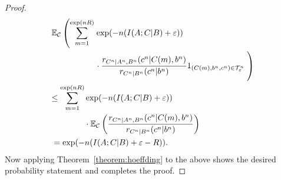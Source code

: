 \documentclass[journal]{IEEEtran}
\newcommand{\generalpmf}{r}
\newcommand{\generalrvOne}{A}
\newcommand{\generalrvTwo}{B}
\newcommand{\generalrvTwoValue}{b}
\newcommand{\generalrvThree}{C}
\newcommand{\generalrvThreeValue}{c}
\newcommand{\codebookRate}{R}
\newcommand{\codebook}{\mathcal{C}}
\newcommand{\codebookWord}[1]{C(#1)}
\newcommand{\codewordIndex}{m}
\newcommand{\codebookBlocklength}{n}
\newcommand{\mutualInformationConditional}[3]{I(#1;#2|#3)}
\newcommand{\Expectation}{\mathbb{E}}
\newcommand{\indicator}[1]{1_{#1}}
\newcommand{\typicalityParam}{\varepsilon}
\newcommand{\typicalSet}[2]{\mathcal{T}_{#1}^{#2}}
\begin{document}
\begin{proof}
\begin{align*}
&
\begin{aligned}
  \Expectation_{\codebook}\left(
    \sum\limits_{\codewordIndex=1}^{\exp(\codebookBlocklength\codebookRate)}
    \right.
    &\exp(-\codebookBlocklength (\mutualInformationConditional{\generalrvOne}{\generalrvThree}{\generalrvTwo} + \typicalityParam))
    \\
    &\cdot
    \frac{\generalpmf_{\generalrvThree^\codebookBlocklength | \generalrvOne^\codebookBlocklength, \generalrvTwo^\codebookBlocklength}(\generalrvThreeValue^\codebookBlocklength | \codebookWord{\codewordIndex}, \generalrvTwoValue^\codebookBlocklength)}
        {\generalpmf_{\generalrvThree^\codebookBlocklength | \generalrvTwo^\codebookBlocklength}(\generalrvThreeValue^\codebookBlocklength | \generalrvTwoValue^\codebookBlocklength)}
    \indicator{(\codebookWord{\codewordIndex}, \generalrvTwoValue^\codebookBlocklength, \generalrvThreeValue^\codebookBlocklength) \in \typicalSet{\typicalityParam}{\codebookBlocklength}}
  \left.
  \vphantom{\sum\limits_{\codewordIndex=1}^{\exp(\codebookBlocklength\codebookRate)}}
  \right)
\end{aligned}
\\
&
\begin{aligned}
  \leq
  \sum\limits_{\codewordIndex=1}^{\exp(\codebookBlocklength\codebookRate)}
  &\exp(-\codebookBlocklength (\mutualInformationConditional{\generalrvOne}{\generalrvThree}{\generalrvTwo} + \typicalityParam))
  \\
  &\cdot
  \Expectation_{\codebook}\left(
    \frac{\generalpmf_{\generalrvThree^\codebookBlocklength | \generalrvOne^\codebookBlocklength, \generalrvTwo^\codebookBlocklength}(\generalrvThreeValue^\codebookBlocklength | \codebookWord{\codewordIndex}, \generalrvTwoValue^\codebookBlocklength)}
        {\generalpmf_{\generalrvThree^\codebookBlocklength | \generalrvTwo^\codebookBlocklength}(\generalrvThreeValue^\codebookBlocklength | \generalrvTwoValue^\codebookBlocklength)}
  \right)
\end{aligned}
\\
&=
\exp(-\codebookBlocklength (\mutualInformationConditional{\generalrvOne}{\generalrvThree}{\generalrvTwo} + \typicalityParam - \codebookRate)).
\end{align*}
Now applying Theorem~\ref{theorem:hoeffding} to the above shows the desired probability statement and completes the proof.
\end{proof}
\end{document}
